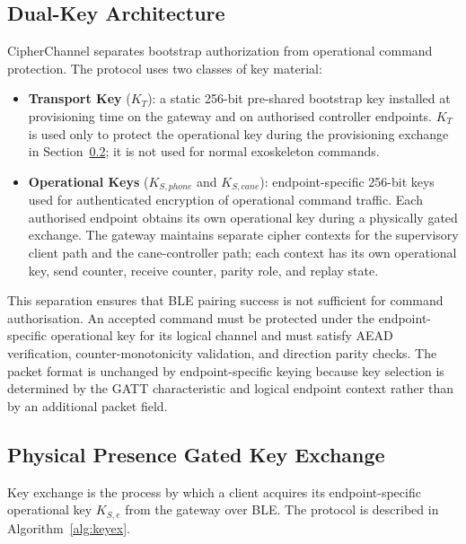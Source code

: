 \documentclass[journal]{IEEEtran}
\begin{document}
\subsection{Dual-Key Architecture}
\label{sec:dualkey}

CipherChannel separates bootstrap authorization from operational command
protection. The protocol uses two classes of key material:

\begin{itemize}
  \item \textbf{Transport Key} ($K_T$): a static 256-bit pre-shared bootstrap key installed at provisioning time on the gateway and on authorised controller endpoints. $K_T$ is used only to protect the operational key during the provisioning exchange in Section~\ref{sec:keyexchange}; it is not used for normal exoskeleton commands.
  \item \textbf{Operational Keys} ($K_{S,phone}$ and $K_{S,cane}$): endpoint-specific 256-bit keys used for authenticated encryption of operational command traffic. Each authorised endpoint obtains its own operational key during a physically gated exchange. The gateway maintains separate cipher contexts for the supervisory client path and the cane-controller path; each context has its own operational key, send counter, receive counter, parity role, and replay state.
\end{itemize}

This separation ensures that BLE pairing success is not sufficient for command authorisation. An accepted command must be protected under the endpoint-specific operational key for its logical channel and must satisfy AEAD verification, counter-monotonicity validation, and direction parity checks. The packet format is unchanged by endpoint-specific keying because key selection is determined by the GATT characteristic and logical endpoint context rather than by an additional packet field.

\subsection{Physical Presence Gated Key Exchange}
\label{sec:keyexchange}

Key exchange is the process by which a client acquires its endpoint-specific operational key $K_{S,e}$ from the gateway over BLE. The protocol is described in
Algorithm~\ref{alg:keyex}.
\end{document}
